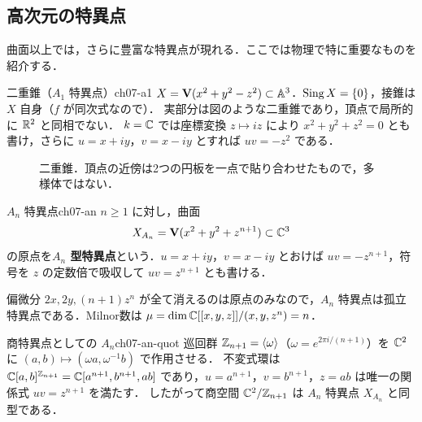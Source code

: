 \subsection{高次元の特異点}

曲面以上では，さらに豊富な特異点が現れる．ここでは物理で特に重要なものを紹介する．

\begin{myex}{二重錐（$A_1$ 特異点）}{ch07-a1}
$X=\mathbf{V}(x^2+y^2-z^2)\subset\mathbb{A}^3$．$\operatorname{Sing} X=\{0\}$，接錐は $X$ 自身（$f$ が同次式なので）．
実部分は図のような二重錐であり，頂点で局所的に $\mathbb{R}^2$ と同相でない．
$k=\mathbb{C}$ では座標変換 $z\mapsto iz$ により $x^2+y^2+z^2=0$ とも書け，さらに $u=x+iy$，$v=x-iy$ とすれば $uv=-z^2$ である．
\end{myex}

\begin{figure}[H]
\centering
{}
\caption{二重錐．頂点の近傍は2つの円板を一点で貼り合わせたもので，多様体ではない．}
\label{fig:ch07-cone}
\end{figure}

\begin{mydef}{$A_n$ 特異点}{ch07-an}
$n\ge1$ に対し，曲面
\[
  X_{A_n}=\mathbf{V}(x^2+y^2+z^{n+1})\subset\mathbb{C}^3
\]
の原点を\textbf{$A_n$ 型特異点}という．$u=x+iy$，$v=x-iy$ とおけば $uv=-z^{n+1}$，符号を $z$ の定数倍で吸収して $uv=z^{n+1}$ とも書ける．
\end{mydef}

偏微分 $2x,2y,(n+1)z^n$ が全て消えるのは原点のみなので，$A_n$ 特異点は孤立特異点である．Milnor数は $\mu=\dim\mathbb{C}[[x,y,z]]/(x,y,z^n)=n$．

\begin{myprop}{商特異点としての $A_n$}{ch07-an-quot}
巡回群 $\mathbb{Z}_{n+1}=\langle\omega\rangle$（$\omega=e^{2\pi i/(n+1)}$）を $\mathbb{C}^2$ に $(a,b)\mapsto(\omega a,\omega^{-1}b)$ で作用させる．
不変式環は $\mathbb{C}[a,b]^{\mathbb{Z}_{n+1}}=\mathbb{C}[a^{n+1},b^{n+1},ab]$ であり，$u=a^{n+1}$，$v=b^{n+1}$，$z=ab$ は唯一の関係式 $uv=z^{n+1}$ を満たす．
したがって商空間 $\mathbb{C}^2/\mathbb{Z}_{n+1}$ は $A_n$ 特異点 $X_{A_n}$ と同型である．
\end{myprop}


